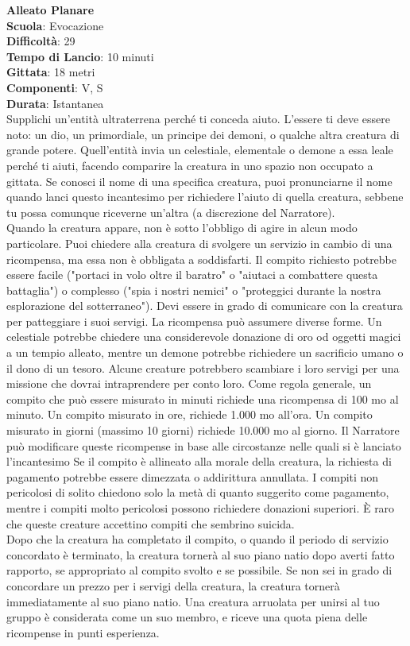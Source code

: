 \begin{multicols}{2}
\medskip\textbf{Alleato Planare}\\
\textbf{Scuola}: Evocazione\\
\textbf{Difficoltà}: 29\\
\textbf{Tempo di Lancio}: 10 minuti\\
\textbf{Gittata}: 18 metri\\
\textbf{Componenti}: V, S\\
\textbf{Durata}: Istantanea\\
Supplichi un'entità ultraterrena perché ti conceda aiuto. L'essere ti deve essere noto: un dio, un primordiale, un principe dei demoni, o qualche altra creatura di grande potere. Quell'entità invia un celestiale, elementale o demone a essa leale perché ti aiuti, facendo comparire la creatura in uno spazio non occupato a gittata. Se conosci il nome di una specifica creatura, puoi pronunciarne il nome quando lanci questo incantesimo per richiedere l'aiuto di quella creatura, sebbene tu possa comunque riceverne un'altra (a discrezione del Narratore).\\
Quando la creatura appare, non è sotto l'obbligo di agire in alcun modo particolare. Puoi chiedere alla creatura di svolgere un servizio in cambio di una ricompensa, ma essa non è obbligata a soddisfarti. Il compito richiesto potrebbe essere facile ("portaci in volo oltre il baratro" o "aiutaci a combattere questa battaglia") o complesso ("spia i nostri nemici" o "proteggici durante la nostra esplorazione del sotterraneo"). Devi essere in grado di comunicare con la creatura per patteggiare i suoi servigi. La ricompensa può assumere diverse forme. Un celestiale potrebbe chiedere una considerevole donazione di oro od oggetti magici a un tempio alleato, mentre un demone potrebbe richiedere un sacrificio umano o il dono di un tesoro. Alcune creature potrebbero scambiare i loro servigi per una missione che dovrai intraprendere per conto loro. Come regola generale, un compito che può essere misurato in minuti richiede una ricompensa di 100 mo al minuto. Un compito misurato in ore, richiede 1.000 mo all'ora. Un compito misurato in giorni (massimo 10 giorni) richiede 10.000 mo al giorno. Il Narratore può modificare queste ricompense in base alle circostanze nelle quali si è lanciato l'incantesimo Se il compito è allineato alla morale della creatura, la richiesta di pagamento potrebbe essere dimezzata o addirittura annullata. I compiti non pericolosi di solito chiedono solo la metà di quanto suggerito come pagamento, mentre i compiti molto pericolosi possono richiedere donazioni superiori. È raro che queste creature accettino compiti che sembrino suicida.\\
Dopo che la creatura ha completato il compito, o quando il periodo di servizio concordato è terminato, la creatura tornerà al suo piano natio dopo averti fatto rapporto, se appropriato al compito svolto e se possibile. Se non sei in grado di concordare un prezzo per i servigi della creatura, la creatura tornerà immediatamente al suo piano natio. Una creatura arruolata per unirsi al tuo gruppo è considerata come un suo membro, e riceve una quota piena delle ricompense in punti esperienza.


\end{multicols}
